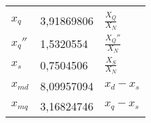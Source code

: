 \begin{longtable}[]{@{}lll@{}}
\begin{minipage}[t]{0.56\columnwidth}
\end{minipage}\tabularnewline
\begin{minipage}[t]{0.11\columnwidth}\raggedright
\(x_q\)\strut
\end{minipage} & \begin{minipage}[t]{0.24\columnwidth}\raggedright
3,91869806\strut
\end{minipage} & \begin{minipage}[t]{0.56\columnwidth}\raggedright
\(\frac{X_Q}{X_N}\)\strut
\end{minipage}\tabularnewline
\begin{minipage}[t]{0.11\columnwidth}\raggedright
\(x_q''\)\strut
\end{minipage} & \begin{minipage}[t]{0.24\columnwidth}\raggedright
1,5320554\strut
\end{minipage} & \begin{minipage}[t]{0.56\columnwidth}\raggedright
\(\frac{X_Q''}{X_N}\)\strut
\end{minipage}\tabularnewline
\begin{minipage}[t]{0.11\columnwidth}\raggedright
\(x_s\)\strut
\end{minipage} & \begin{minipage}[t]{0.24\columnwidth}\raggedright
0,7504506\strut
\end{minipage} & \begin{minipage}[t]{0.56\columnwidth}\raggedright
\(\frac{X_S}{X_N}\)\strut
\end{minipage}\tabularnewline
\begin{minipage}[t]{0.11\columnwidth}\raggedright
\(x_{md}\)\strut
\end{minipage} & \begin{minipage}[t]{0.24\columnwidth}\raggedright
8,09957094\strut
\end{minipage} & \begin{minipage}[t]{0.56\columnwidth}\raggedright
\(x_d-x_s\)\strut
\end{minipage}\tabularnewline
\begin{minipage}[t]{0.11\columnwidth}\raggedright
\(x_{mq}\)\strut
\end{minipage} & \begin{minipage}[t]{0.24\columnwidth}\raggedright
3,16824746\strut
\end{minipage} & \begin{minipage}[t]{0.56\columnwidth}\raggedright
\(x_q-x_s\)\strut
\end{minipage}\tabularnewline

\end{longtable}
